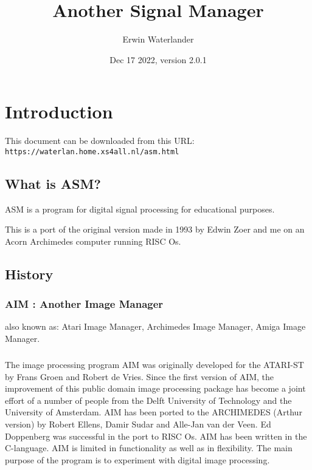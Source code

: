 \documentclass{report}
\title{Another Signal Manager}
\author{Erwin Waterlander}
\date{Dec 17 2022, version 2.0.1}          %
\begin{document}

\maketitle                   %

\tableofcontents

\chapter{Introduction}\label{chap:intro}

This document can be downloaded from this URL:\\
\texttt{https://waterlan.home.xs4all.nl/asm.html}


\section{What is ASM?}


ASM is a program for digital signal processing for educational
purposes.

This is a port of the original version made in 1993 by Edwin Zoer and me on an
Acorn Archimedes computer running RISC Os.

\section{History}

\subsection{AIM : Another Image Manager}

also known as:
Atari Image Manager,
Archimedes Image Manager,
Amiga Image Manager. 

\paragraph{}
The image processing program AIM was originally developed for the 
ATARI-ST  by Frans Groen and  Robert de Vries.  Since  the  first 
version  of  AIM, the improvement of  this  public  domain  image 
processing  package  has  become a joint effort of  a  number  of 
people from the Delft University of Technology and the University 
of  Amsterdam.
AIM has been ported to the ARCHIMEDES (Arthur version) by  Robert
Ellens, Damir Sudar and Alle-Jan van der Veen.
Ed Doppenberg  was successful in the port to RISC Os. 
AIM has been written in the C-language. 
AIM is limited in functionality as well as in flexibility.
The main  purpose of the program is to experiment with digital
image processing.
\end{document}
